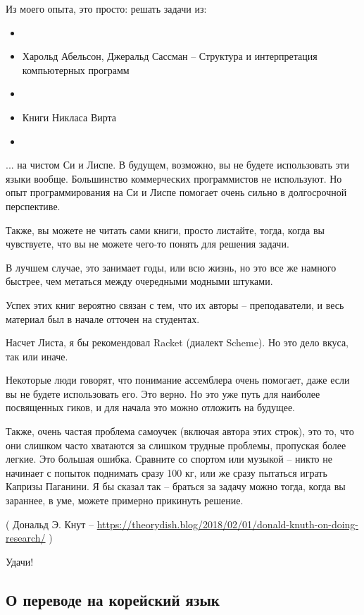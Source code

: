 Из моего опыта, это просто: решать задачи из:

\begin{itemize}
\item \KRBook
\item Харольд Абельсон, Джеральд Сассман -- Структура и интерпретация компьютерных программ
\item \TAOCP
\item Книги Никласа Вирта
\item \RobPikePractice
\end{itemize}

... на чистом Си и Лиспе.
В будущем, возможно, вы не будете использовать эти языки вообще.
Большинство коммерческих программистов не используют. Но опыт программирования на Си и Лиспе помогает очень сильно в 
долгосрочной перспективе.

Также, вы можете не читать сами книги, просто листайте, тогда, когда вы чувствуете, что вы не можете чего-то
понять для решения задачи.

В лучшем случае, это занимает годы, или всю жизнь, но это все же намного быстрее, чем метаться между очередными модными
штуками.

Успех этих книг вероятно связан с тем, что их авторы -- преподаватели, и весь материал был в начале отточен на студентах.

Насчет Листа, я бы рекомендовал Racket (диалект Scheme). Но это дело вкуса, так или иначе.

Некоторые люди говорят, что понимание ассемблера очень помогает, даже если вы не будете использовать его.
Это верно.
Но это уже путь для наиболее посвященных гиков, и для начала это можно отложить на будущее.

Также, очень частая проблема самоучек (включая автора этих строк), это то, что они слишком часто хватаются
за слишком трудные проблемы, пропуская более легкие.
Это большая ошибка.
Сравните со спортом или музыкой -- никто не начинает с попыток поднимать сразу 100 кг,
или же сразу пытаться играть Капризы Паганини.
Я бы сказал так -- браться за задачу можно тогда, когда вы зараннее, в уме, можете примерно прикинуть решение.


( Дональд Э. Кнут -- \url{https://theorydish.blog/2018/02/01/donald-knuth-on-doing-research/} )

Удачи!

\subsection*{О переводе на корейский язык}

